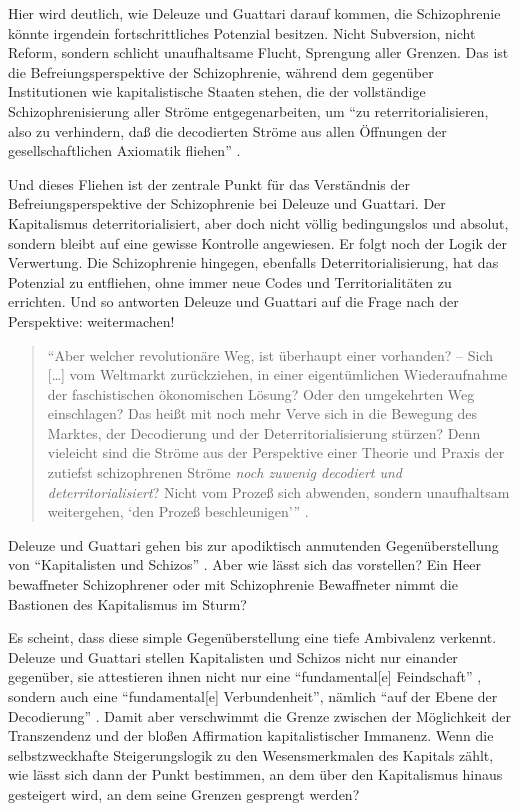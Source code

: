 \documentclass[12pt,
               paper=a4,
               twoside=false,
               onehalfspacing,
               bibliography=totoc,
               toc=graduated,
               ]{scrartcl}
\newcommand{\lips}{\dots\unkern}
\newcommand{\pc}[2]{\parencite[#1]{#2}}
\newcommand{\worries}[1]{\ifdraft{\textcolor{blue}{\texttt{(#1)}}}{}}
\newcommand{\dg}{Deleuze und Guattari\xspace}
\begin{document}
Hier wird deutlich, wie \dg darauf kommen, die Schizophrenie könnte
irgendein fortschrittliches Potenzial besitzen. Nicht Subversion,
nicht Reform, sondern schlicht unaufhaltsame Flucht, Sprengung aller
Grenzen. Das ist die Befreiungsperspektive der Schizophrenie, während
dem gegenüber Institutionen wie kapitalistische Staaten stehen, die
der vollständige Schizophrenisierung aller Ströme entgegenarbeiten, um
"`zu reterritorialisieren, also zu verhindern, daß die decodierten
Ströme aus allen Öffnungen der gesellschaftlichen Axiomatik fliehen"'
\pc{332}{ao}.

Und dieses Fliehen ist der zentrale Punkt für das Verständnis der
Befreiungsperspektive der Schizophrenie bei Deleuze und Guattari. Der
Kapitalismus deterritorialisiert, aber doch nicht völlig bedingungslos
und absolut, sondern bleibt auf eine gewisse Kontrolle angewiesen. Er
folgt noch der Logik der Verwertung. Die Schizophrenie hingegen,
ebenfalls Deterritorialisierung, hat das Potenzial zu entfliehen, ohne
immer neue Codes und Territorialitäten zu errichten. Und so antworten
Deleuze und Guattari auf die Frage nach der Perspektive: weitermachen!
%
\begin{spacing}{1}
\begin{quote}
\enquote{Aber welcher revolutionäre Weg, ist
überhaupt einer vorhanden? -- Sich [\lips] vom Weltmarkt zurückziehen,
in einer eigentümlichen Wiederaufnahme der faschistischen \glq
ökonomischen Lösung\grq? Oder den umgekehrten Weg einschlagen? Das
heißt mit noch mehr Verve sich in die Bewegung des Marktes, der
Decodierung und der Deterritorialisierung stürzen? Denn vieleicht sind
die Ströme aus der Perspektive einer Theorie und Praxis der
zutiefst schizophrenen Ströme \emph{noch zuwenig decodiert und
deterritorialisiert}? Nicht vom Prozeß sich abwenden, sondern
unaufhaltsam weitergehen, \enquote{den Prozeß beschleunigen}}
\pc{S. 308, meine Hervorh.}{ao}.
\end{quote}
\end{spacing}

\dg gehen bis zur apodiktisch anmutenden Gegenüberstellung von
"`Kapitalisten und Schizos"' \pc{328}{ao}. Aber wie lässt sich das
vorstellen? Ein Heer bewaffneter Schizophrener oder mit Schizophrenie
Bewaffneter nimmt die Bastionen des Kapitalismus im Sturm?

Es scheint, dass diese simple Gegenüberstellung eine tiefe Ambivalenz
verkennt. \dg stellen Kapitalisten und Schizos nicht nur einander
gegenüber, sie attestieren ihnen nicht nur eine "`fundamental[e]
Feindschaft"' \pc{328}{ao}, sondern auch eine "`fundamental[e]
Verbundenheit"', nämlich "`auf der Ebene der Decodierung"'
\pc{328}{ao}. Damit aber verschwimmt die Grenze zwischen der
Möglichkeit der Transzendenz und der bloßen Affirmation
kapitalistischer Immanenz.
Wenn die selbstzweckhafte Steigerungslogik zu den Wesensmerkmalen des
Kapitals zählt, wie lässt sich dann der Punkt bestimmen, an dem über
den Kapitalismus hinaus gesteigert wird, an dem seine Grenzen
gesprengt werden?
\end{document}
